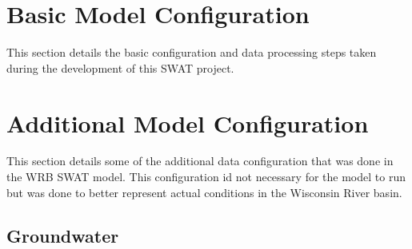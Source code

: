 	
\pagebreak
\section{Basic Model Configuration}\label{sec:basic_model_config}
	This section details the basic configuration and data processing steps taken during the development of this SWAT project.
	
	
	
	
	
	
	
	
\pagebreak


%		
	
\pagebreak
\section{Additional Model Configuration}
	This section details some of the additional data configuration that was done in the WRB SWAT model. 
	This configuration id not necessary for the model to run but was done to better represent actual conditions in the Wisconsin River basin.
	
	
	
	
	
	
\subsection{Groundwater}
	
	
	
	
\pagebreak